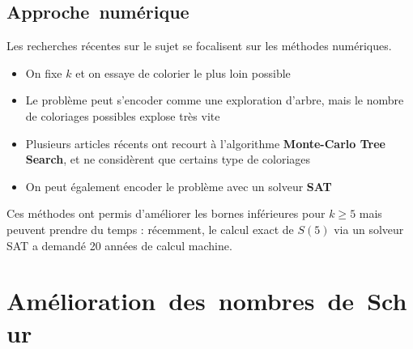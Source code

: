 \documentclass[graphics]{beamer}
\begin{document}
\subsection{Approche~numérique}

\begin{frame}
	Les recherches récentes sur le sujet se focalisent sur les méthodes numériques.
	\begin{itemize}
		\item On fixe \(k\) et on essaye de colorier le plus loin possible
		\item Le problème peut s'encoder comme une exploration d'arbre, mais le nombre de coloriages possibles
		explose très vite 
		\item Plusieurs articles récents ont recourt à l'algorithme \textbf{Monte-Carlo Tree Search}, et ne considèrent 
		que certains type de coloriages
		\item On peut également encoder le problème avec un solveur \textbf{SAT} 
	\end{itemize}
	\pause
	Ces méthodes ont permis d'améliorer les bornes inférieures pour \(k \geq 5\) mais peuvent prendre du temps :
	récemment, le calcul exact de \(S(5)\) via un solveur SAT a demandé 20 années de calcul machine.
\end{frame}

\section{Amélioration~des~nombres~de~Schur}
\end{document}
